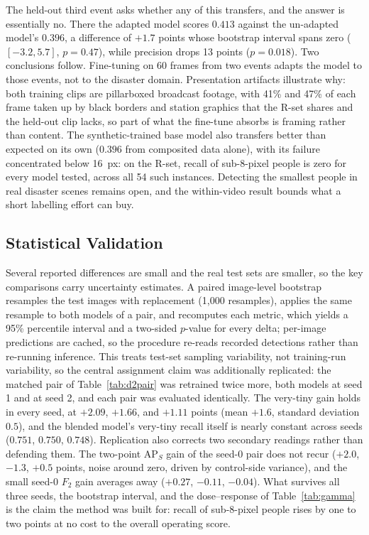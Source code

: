 \documentclass[12pt,a4paper,oneside]{report}
\begin{document}
The held-out third event asks whether any of this transfers, and the answer is
essentially no. There the adapted model scores $0.413$ against the un-adapted
model's $0.396$, a difference of $+1.7$ points whose bootstrap interval spans
zero ($[-3.2, 5.7]$, $p=0.47$), while precision drops 13 points
($p=0.018$). Two conclusions follow. Fine-tuning on 60
frames from two events adapts the model to those events, not to the disaster
domain. Presentation artifacts illustrate why: both training clips are
pillarboxed broadcast footage, with 41\% and 47\% of each frame taken up by
black borders and station graphics that the R-set shares and the held-out
clip lacks, so part of what the fine-tune absorbs is framing rather than
content. The synthetic-trained base model also transfers better than expected
on its own ($0.396$ from composited data alone), with its failure
concentrated below 16~px: on the R-set, recall of sub-8-pixel people is zero
for every model tested, across all 54 such instances. Detecting the smallest
people in real disaster scenes remains open, and the within-video result
bounds what a short labelling effort can buy.

\subsection{Statistical Validation}
\label{sec:stats}
Several reported differences are small and the real test sets are smaller, so
the key comparisons carry uncertainty estimates. A paired image-level
bootstrap resamples the test images with replacement (1{,}000 resamples),
applies the same resample to both models of a pair, and recomputes each
metric, which yields a 95\% percentile interval and a two-sided $p$-value for
every delta; per-image predictions are cached, so the procedure re-reads
recorded detections rather than re-running inference. This treats test-set
sampling variability, not training-run variability, so the central assignment
claim was additionally replicated: the matched pair of Table~\ref{tab:d2pair}
was retrained twice more, both models at seed 1 and at seed 2, and each pair
was evaluated identically. The very-tiny gain holds in every seed, at
$+2.09$, $+1.66$, and $+1.11$ points (mean $+1.6$, standard deviation
$0.5$), and the blended model's very-tiny recall itself is nearly constant
across seeds ($0.751$, $0.750$, $0.748$). Replication also corrects two
secondary readings rather than defending them. The two-point $\mathrm{AP}_S$
gain of the seed-0 pair does not recur ($+2.0$, $-1.3$, $+0.5$ points,
noise around zero, driven by control-side variance), and the small seed-0
$F_2$ gain averages away ($+0.27$, $-0.11$, $-0.04$). What survives all
three seeds, the bootstrap interval, and the dose--response of
Table~\ref{tab:gamma} is the claim the method was built for: recall of
sub-8-pixel people rises by one to two points at no cost to the overall
operating score.
\end{document}
